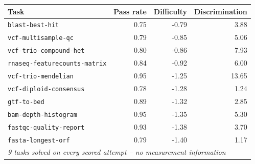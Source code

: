 \begin{tabular}{lrrr}
\toprule
Task & Pass rate & Difficulty & Discrimination \\
\midrule
\texttt{blast-best-hit} & 0.75 & -0.79 & 3.88 \\
\texttt{vcf-multisample-qc} & 0.79 & -0.85 & 5.06 \\
\texttt{vcf-trio-compound-het} & 0.80 & -0.86 & 7.93 \\
\texttt{rnaseq-featurecounts-matrix} & 0.84 & -0.92 & 6.00 \\
\texttt{vcf-trio-mendelian} & 0.95 & -1.25 & 13.65 \\
\texttt{vcf-diploid-consensus} & 0.78 & -1.28 & 1.24 \\
\texttt{gtf-to-bed} & 0.89 & -1.32 & 2.85 \\
\texttt{bam-depth-histogram} & 0.95 & -1.35 & 5.30 \\
\texttt{fastqc-quality-report} & 0.93 & -1.38 & 3.70 \\
\texttt{fasta-longest-orf} & 0.79 & -1.40 & 1.17 \\
\midrule
\multicolumn{4}{l}{\emph{9 tasks solved on every scored attempt -- no measurement information}} \\
\bottomrule
\end{tabular}
